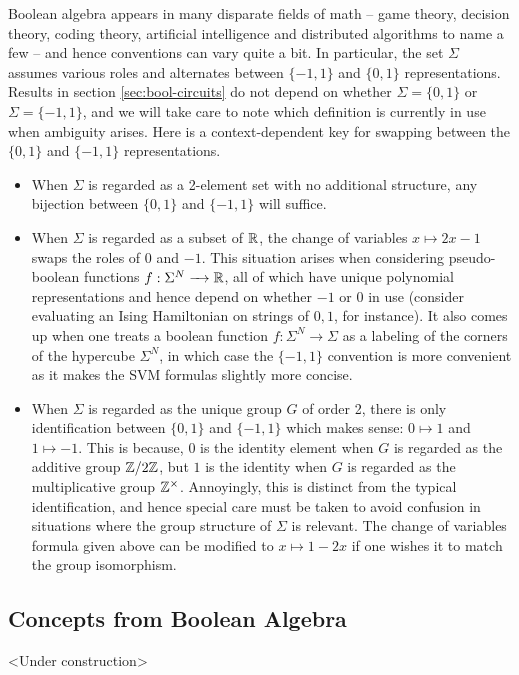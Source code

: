 \documentclass{article}
\begin{document}
\begin{rmk}\label{rmk:sigma_convention}
  Boolean algebra appears in many disparate fields of math -- game theory, decision theory, coding theory, artificial intelligence and distributed algorithms to name a few -- and hence conventions can vary quite a bit. In particular, the set $\Sigma$ assumes various roles and alternates between $\{-1, 1\}$ and $\{0,1\}$ representations. Results in section \ref{sec:bool-circuits} do not depend on whether $\Sigma = \{0,1\}$ or $\Sigma = \{-1,1\}$, and we will take care to note which definition is currently in use when ambiguity arises. Here is a context-dependent key for swapping between the $\{0,1\}$ and $\{-1,1\}$ representations.
  \begin{itemize}
    \item When $\Sigma$ is regarded as a 2-element set with no additional structure, any bijection between $\{0,1\}$ and $\{-1,1\}$ will suffice.
    \item When $\Sigma$ is regarded as a subset of $\mathbb{R}$, the change of variables $x \mapsto 2x - 1$ swaps the roles of $0$ and $-1$. This situation arises when considering pseudo-boolean functions $f:\Sigma^N \to \bR$, all of which have unique polynomial representations and hence depend on whether $-1$ or $0$ in use (consider evaluating an Ising Hamiltonian on strings of $0,1$, for instance). It also comes up when one treats a boolean function $f:\Sigma^N \to \Sigma$ as a labeling of the corners of the hypercube $\Sigma^N$, in which case the $\{-1,1\}$ convention is more convenient as it makes the SVM formulas slightly more concise.
    \item When $\Sigma$ is regarded as the unique group $G$ of order 2, there is only identification between $\{0,1\}$ and $\{-1,1\}$ which makes sense: $0 \mapsto 1$ and $1 \mapsto -1$. This is because, $0$ is the identity element when $G$ is regarded as the additive group $\mathbb{Z}/2\mathbb{Z}$, but $1$ is the identity when $G$ is regarded as the multiplicative group $\mathbb{Z}^\times$. Annoyingly, this is distinct from the typical identification, and hence special care must be taken to avoid confusion in situations where the group structure of $\Sigma$ is relevant. The change of variables formula given above can be modified to $x \mapsto 1 - 2x$ if one wishes it to match the group isomorphism.
  \end{itemize}
\end{rmk}
\subsection{Concepts from Boolean Algebra}
\begin{center}
  <Under construction>
\end{center}
\end{document}
